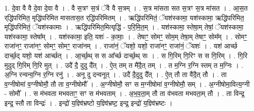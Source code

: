 \documentclass[17pt]{extarticle}
\begin{document}
1. दे॒वा वै वै दे॒वा दे॒वा वै । . वै स॒त्रꣳ स॒त्रं ॅवै वै स॒त्रम् । . स॒त्र मा॑सता सत स॒त्रꣳ स॒त्र मा॑सत । . आ॒स॒त र्‌द्धि॑परिमित॒ मृद्धि॑परिमित मासतास॒त र्‌द्धि॑परिमितम् । . ऋद्धि॑परिमितं॒ ॅयश॑स्कामा॒ यश॑स्कामा॒ ऋद्धि॑परिमित॒ मृद्धि॑परिमितं॒ ॅयश॑स्कामाः । . ऋद्धि॑परिमित॒मित्यृद्धि॑ - प॒रि॒मि॒त॒म् । . यश॑स्कामा॒ स्तेषा॒म् तेषां॒ ॅयश॑स्कामा॒ यश॑स्कामा॒ स्तेषा᳚म् । . यश॑स्कामा॒ इति॒ यशः॑ - का॒माः॒ । . तेषाꣳ॒॒ सोमꣳ॒॒ सोम॒म् तेषा॒म् तेषाꣳ॒॒ सोम᳚म् । . सोमꣳ॒॒ राजा॑नꣳ॒॒ राजा॑नꣳ॒॒ सोमꣳ॒॒ सोमꣳ॒॒ राजा॑नम् । . राजा॑नं॒ ॅयशो॒ यशो॒ राजा॑नꣳ॒॒ राजा॑नं॒ ॅयशः॑ । . यश॑ आर्च्छ दार्च्छ॒द् यशो॒ यश॑ आर्च्छत् । . आ॒र्च्छ॒थ् स स आ᳚र्च्छ दार्च्छ॒थ् सः । . स गि॒रिम् गि॒रिꣳ स स गि॒रिम् । . गि॒रि मुदुद् गि॒रिम् गि॒रि मुत् । . उदै॑ दै॒ दुदु दै᳚त् । . ऐ॒त् तम् त मै॑दै॒त् तम् । . त म॒ग्नि र॒ग्नि स्तम् त म॒ग्निः । . अ॒ग्नि रन्वन्व॒ग्नि र॒ग्नि रनु॑ । . अनू दु दन्वनूत् । . उदै॑ दै॒दुदु दै᳚त् । . ऐ॒त् तौ ता वै॑दै॒त् तौ । . ता व॒ग्नीषोमा॑ व॒ग्नीषोमौ॒ तौ ता व॒ग्नीषोमौ᳚ । . अ॒ग्नीषोमौ॒ सꣳ स म॒ग्नीषोमा॑ व॒ग्नीषोमौ॒ सम् । . अ॒ग्नीषोमा॒वित्य॒ग्नी - सोमौ᳚ । . स म॑भवता मभवताꣳ॒॒ सꣳ स म॑भवताम् । . अ॒भ॒व॒ता॒म् तौ ता व॑भवता मभवता॒म् तौ । . ता विन्द्र॒ इन्द्र॒ स्तौ ता विन्द्रः॑ । . इन्द्रो॑ य॒ज्ञ्वि॑भ्रष्टो य॒ज्ञ्वि॑भ्रष्ट॒ इन्द्र॒ इन्द्रो॑ य॒ज्ञ्वि॑भ्रष्टः । \newline
\end{document}
